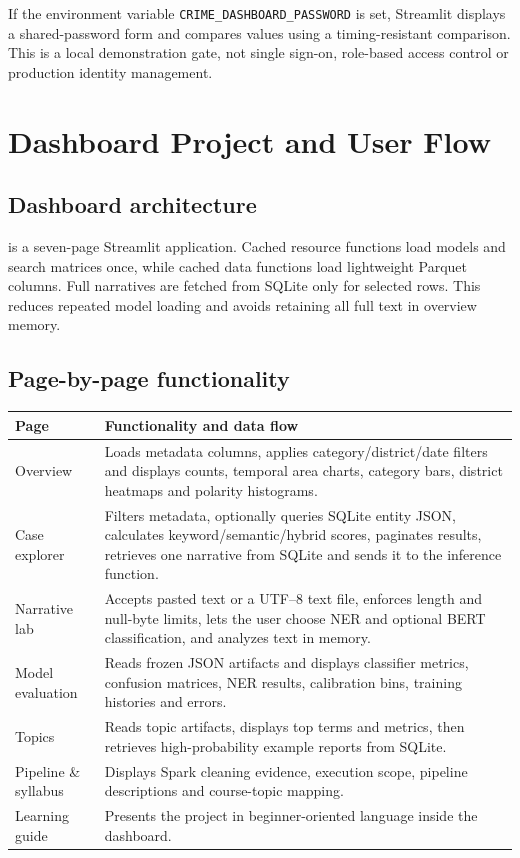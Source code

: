 \documentclass[12pt,a4paper]{report}
\newcommand{\code}[1]{\texttt{#1}}
\begin{document}
If the environment variable \code{CRIME\_DASHBOARD\_PASSWORD} is set, Streamlit displays a shared-password form and compares values using a timing-resistant comparison. This is a local demonstration gate, not single sign-on, role-based access control or production identity management.

\chapter{Dashboard Project and User Flow}

\section{Dashboard architecture}

 is a seven-page Streamlit application. Cached resource functions load models and search matrices once, while cached data functions load lightweight Parquet columns. Full narratives are fetched from SQLite only for selected rows. This reduces repeated model loading and avoids retaining all full text in overview memory.

\section{Page-by-page functionality}

\begin{longtable}{p{}p{}}
\toprule
Page & Functionality and data flow \\
\midrule
\endhead
Overview & Loads metadata columns, applies category/district/date filters and displays counts, temporal area charts, category bars, district heatmaps and polarity histograms. \\
Case explorer & Filters metadata, optionally queries SQLite entity JSON, calculates keyword/semantic/hybrid scores, paginates results, retrieves one narrative from SQLite and sends it to the inference function. \\
Narrative lab & Accepts pasted text or a UTF--8 text file, enforces length and null-byte limits, lets the user choose NER and optional BERT classification, and analyzes text in memory. \\
Model evaluation & Reads frozen JSON artifacts and displays classifier metrics, confusion matrices, NER results, calibration bins, training histories and errors. \\
Topics & Reads topic artifacts, displays top terms and metrics, then retrieves high-probability example reports from SQLite. \\
Pipeline \& syllabus & Displays Spark cleaning evidence, execution scope, pipeline descriptions and course-topic mapping. \\
Learning guide & Presents the project in beginner-oriented language inside the dashboard. \\
\bottomrule
\end{longtable}
\end{document}
